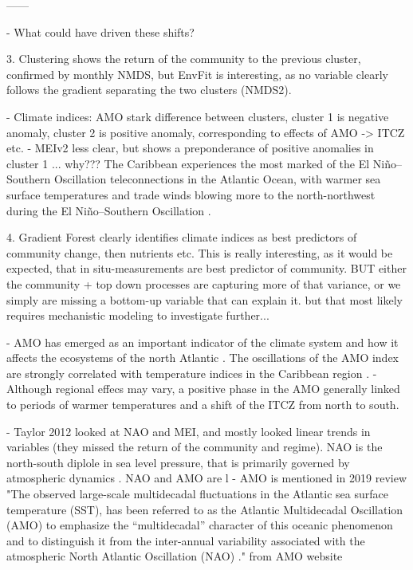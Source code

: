     ------


    

- What could have driven these shifts?


3. Clustering shows the return of the community to the previous cluster, confirmed by monthly NMDS, but EnvFit is interesting, as no variable clearly follows the gradient separating the two clusters (NMDS2).

- Climate indices: AMO stark difference between clusters, cluster 1 is negative anomaly, cluster 2 is positive anomaly, corresponding to effects of AMO -> ITCZ etc.
- MEIv2 less clear, but shows a preponderance of positive anomalies in cluster 1 ... why???
The Caribbean experiences the most marked of the El Niño–Southern Oscillation teleconnections in the Atlantic Ocean, with warmer sea surface temperatures and trade winds blowing more to the north-northwest during the El Niño–Southern Oscillation \cite{enfield_tropical_1997}.

4. Gradient Forest clearly identifies climate indices as best predictors of community change, then nutrients etc.
    This is really interesting, as it would be expected, that in situ-measurements are best predictor of community. BUT either the community + top down processes are capturing more of that variance, or we simply are missing a bottom-up variable that can explain it.
    but that most likely requires mechanistic modeling to investigate further...

    - AMO has emerged as an important indicator of the climate system and how it affects the ecosystems of the north Atlantic \cite{nye_ecosystem_2014}. The oscillations of the AMO index are strongly correlated with temperature indices in the Caribbean region \cite{stephenson_changes_2014}.
    - Although regional effecs may vary, a positive phase in the AMO generally linked to periods of warmer temperatures and a shift of the ITCZ from north to south.
    
    - Taylor 2012 looked at NAO and MEI, and mostly looked linear trends in variables (they missed the return of the community and regime). NAO is the north-south diplole in sea level pressure, that is primarily governed by atmospheric dynamics \cite{hurrell_north_2009}. NAO and AMO are l
    - AMO is mentioned in 2019 review
    "The observed large-scale multidecadal fluctuations in the Atlantic sea surface temperature (SST), has been referred to as the Atlantic Multidecadal Oscillation (AMO) \cite{kerr2000north} to emphasize the “multidecadal” character of this oceanic phenomenon and to distinguish it from the inter-annual variability associated with the atmospheric North Atlantic Oscillation (NAO) \cite{enfield2001atlantic}." from AMO website

